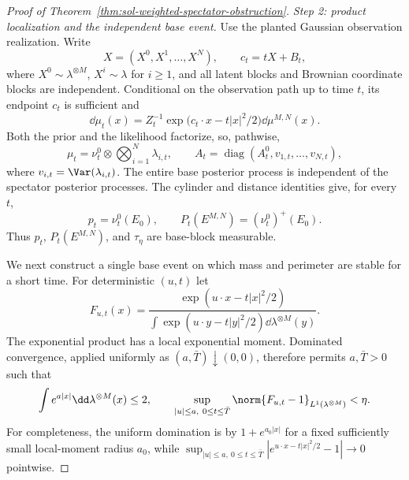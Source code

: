 \documentclass[../main.tex]{subfiles}
\begin{document}
\begin{proof}[Proof of Theorem~\ref{thm:sol-weighted-spectator-obstruction}]
\emph{Step 2: product localization and the independent base event.}
Use the planted Gaussian observation realization.  Write
\[
  X=(X^0,X^1,\ldots,X^N),
  \qquad
  c_t=tX+B_t,
\]
where $X^0\sim\lambda^{\otimes M}$, $X^i\sim\lambda$ for $i\ge1$, and all latent blocks and
Brownian coordinate blocks are independent.  Conditional on the observation path up to time
$t$, its endpoint $c_t$ is sufficient and
\[
  \dd\mu_t(x)=Z_t^{-1}
  \exp\bigl(c_t\cdot x-t|x|^2/2\bigr)\dd\mu^{M,N}(x).
\]
Both the prior and the likelihood factorize, so, pathwise,
\begin{equation}
  \mu_t=\nu_t^0\otimes\bigotimes_{i=1}^N\lambda_{i,t},
  \qquad
  A_t=\operatorname{diag}(A_t^0,v_{1,t},\ldots,v_{N,t}),
  \label{eq:sol-spectator-factorization}
\end{equation}
where $v_{i,t}=\Var(\lambda_{i,t})$.  The entire base posterior process is independent of the
spectator posterior processes.  The cylinder and distance identities give, for every $t$,
\begin{equation}
  p_t=\nu_t^0(E_0),
  \qquad
  P_t(E^{M,N})=(\nu_t^0)^+(E_0).
  \label{eq:sol-spectator-cylinder-localized}
\end{equation}
Thus $p_t$, $P_t(E^{M,N})$, and $\tau_\eta$ are base-block measurable.

We next construct a single base event on which mass and perimeter are stable for a short time.
For deterministic $(u,t)$ let
\[
  F_{u,t}(x)=
  \frac{\exp(u\cdot x-t|x|^2/2)}
       {\int\exp(u\cdot y-t|y|^2/2)\dd\lambda^{\otimes M}(y)}.
\]
The exponential product has a local exponential moment.  Dominated convergence, applied
uniformly as $(a,\bar T)\downarrow(0,0)$, therefore permits $a,\bar T>0$ such that
\begin{equation}
  \int e^{a|x|}\dd\lambda^{\otimes M}(x)\le2,
  \qquad
  \sup_{|u|\le a,\ 0\le t\le\bar T}
  \norm{F_{u,t}-1}_{L^1(\lambda^{\otimes M})}<\eta.
  \label{eq:sol-spectator-l1-stability}
\end{equation}
For completeness, the uniform domination is by $1+e^{a_0|x|}$ for a fixed sufficiently small
local-moment radius $a_0$, while
$\sup_{|u|\le a,\ 0\le t\le\bar T}|e^{u\cdot x-t|x|^2/2}-1|\to0$ pointwise.


\end{proof}
\end{document}
